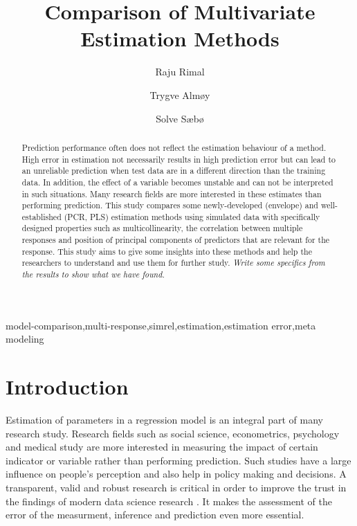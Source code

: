 \documentclass[12pt,3p,authoryear]{elsarticle}
\begin{document}
\begin{frontmatter}

  \title{Comparison of Multivariate Estimation Methods}
  
    \author[KBM]{Raju Rimal}
    \author[KBM]{Trygve Almøy}
  
    \author[NMBU]{Solve Sæbø}
  
      \address[KBM]{Faculty of Chemistry and Bioinformatics, Norwegian University of Life Sciences, Ås, Norway}
    \address[NMBU]{Prorector, Norwegian University of Life Sciences, Ås, Norway}
  
  \begin{abstract}
  Prediction performance often does not reflect the estimation behaviour of a method. High error in estimation not necessarily results in high prediction error but can lead to an unreliable prediction when test data are in a different direction than the training data. In addition, the effect of a variable becomes unstable and can not be interpreted in such situations. Many research fields are more interested in these estimates than performing prediction. This study compares some newly-developed (envelope) and well-established (PCR, PLS) estimation methods using simulated data with specifically designed properties such as multicollinearity, the correlation between multiple responses and position of principal components of predictors that are relevant for the response. This study aims to give some insights into these methods and help the researchers to understand and use them for further study. \emph{Write some specifics from the results to show what we have found.}
  \end{abstract}
   \begin{keyword} model-comparison,multi-response,simrel,estimation,estimation error,meta modeling\end{keyword}

\end{frontmatter}

\hypertarget{introduction}{%
\section{Introduction}\label{introduction}}

Estimation of parameters in a regression model is an integral part of many research study. Research fields such as social science, econometrics, psychology and medical study are more interested in measuring the impact of certain indicator or variable rather than performing prediction. Such studies have a large influence on people's perception and also help in policy making and decisions. A transparent, valid and robust research is critical in order to improve the trust in the findings of modern data science research \citep{eu2019auethics}. It makes the assessment of the error of the measurment, inference and prediction even more essential.
\end{document}
